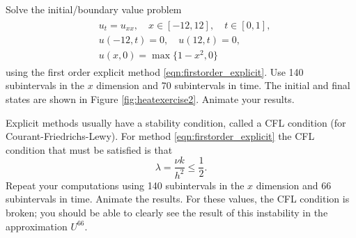 \begin{problem}
\label{prob:heat_exercise2}
Solve the initial/boundary value problem
\begin{align}
	\begin{split}
	&{ } u_t = u_{xx}, \quad x \in [-12,12],\quad t \in [0,1], \\
	&{ } u(-12,t) = 0,\quad u(12,t) = 0,\\
	&{ } u(x,0) = \max\{1 - x^2,0\}
	\end{split}
\end{align}
using the first order explicit method \ref{eqn:firstorder_explicit}.
Use 140 subintervals in the $x$ dimension and 70 subintervals in time.
The initial and final states are shown in Figure \ref{fig:heatexercise2}.
Animate your results.

Explicit methods usually have a stability condition, called a CFL condition (for Courant-Friedrichs-Lewy).
For method \ref{eqn:firstorder_explicit} the CFL condition that must be satisfied is that
\[\lambda=\frac{\nu k}{h^2} \leq \frac{1}{2}.\]
Repeat your computations using 140 subintervals in the $x$ dimension and 66 subintervals in time. Animate the results.
For these values, the CFL condition is broken; you should be able to clearly see the result of this instability in the approximation $U^{66}$.
\end{problem}

